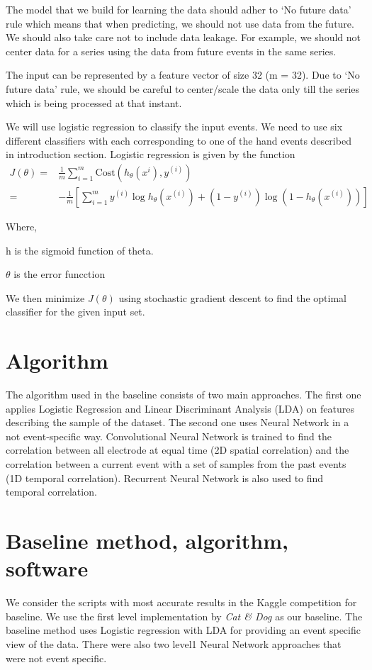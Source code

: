 \documentclass[final,leqno,onefignum,onetabnum]{siamltexmm}
\begin{document}
The model that we build for learning the data should adher to `No future data' rule\cite{kaggledata} which means that when predicting, we should not use data from the future.  We should also take care not to include data leakage.  For example, we should not center data for a series using the data from future events in the same series.

The input can be represented by a feature vector of size 32 (m = 32).  
Due to `No future data' rule, we should be careful to center/scale the data only till the series which is being processed at that instant.

We will use logistic regression to classify the input events.  We need to use six different classifiers with each corresponding to one of the hand events described in introduction section.  Logistic regression is given by the function
\begin{align*}
  J(\theta) = & \frac{1}{m} \sum_{i = 1}^{m} \mathrm{Cost}(h_{\theta}(x^{i}), y^{(i)}) \\
  = & -\frac{1}{m} [\sum_{i=1}^{m} y^{(i)} \log{h_{\theta}(x^{(i)} )} + (1 - y^{(i)}) \log{( 1 - h_{\theta}(x^{(i)}) )}]
\end{align*}

Where,

h is the sigmoid function of theta.

\(\theta\) is the error funcction

We then minimize \(J(\theta)\) using stochastic gradient descent to find the optimal classifier for the given input set.

\section{Algorithm}
The algorithm used in the baseline consists of two main approaches. The first one applies Logistic Regression and Linear Discriminant Analysis (LDA) on features describing the sample of the dataset. The second one uses Neural Network in a not event-specific way. Convolutional Neural Network is trained to find the correlation between all electrode at equal time (2D spatial correlation) and the correlation between a current event with a set of samples from the past events (1D temporal correlation). Recurrent Neural Network is also used to find temporal correlation.


\section{Baseline method, algorithm, software}
We consider the scripts with most accurate results in the Kaggle competition for baseline\cite{kaggleleaderboard}.  We use the first level implementation by \textit{Cat \& Dog}\cite{kagglewinners} as our baseline.
The baseline method uses Logistic regression with LDA for providing an event specific view of the data.  There were also two level1 Neural Network approaches that were not event specific.
\end{document}

